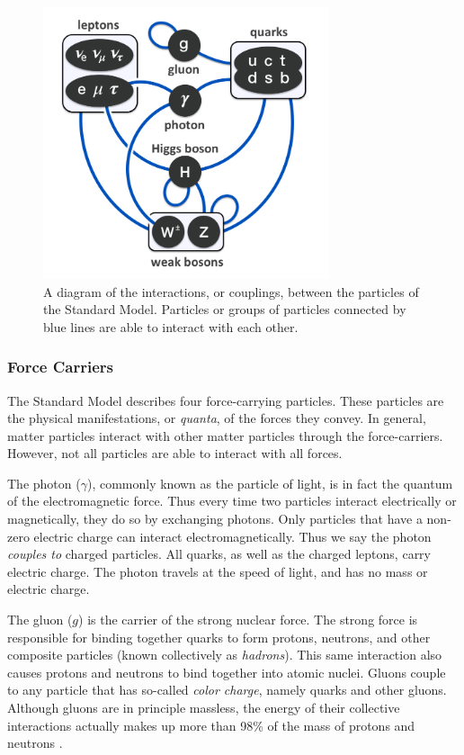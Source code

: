 \begin{figure}[h]
  \centering
  \includegraphics[width=0.75\textwidth]{figures/couplings.png}
  \caption{A diagram of the interactions, or couplings,
    between the particles of the Standard Model. Particles or groups
    of particles connected by blue lines are able to interact with
    each other.}
  \label{fig:couplings}
\end{figure}

\subsubsection*{Force Carriers}
The Standard Model describes four force-carrying particles. These
particles are the physical manifestations, or \emph{quanta}, of the forces
they convey. In general, matter particles interact with other matter
particles through the force-carriers. However, not all particles are
able to interact with all forces.


The photon ($\gamma$), commonly known as the particle of light,
is in fact the quantum of the electromagnetic
force. Thus every time two particles interact electrically or
magnetically, they do so by exchanging photons. Only particles that
have a non-zero electric charge can interact electromagnetically. Thus
we say the photon \emph{couples to} charged particles. All quarks, as
well as the charged leptons, carry electric charge. The photon travels
at the speed of light, and has no mass or electric charge.

The gluon ($g$) is the carrier of the strong nuclear force. The strong
force is responsible for binding together quarks to form protons,
neutrons, and other composite particles (known collectively as
\emph{hadrons}). This same interaction also causes protons and neutrons to
bind together into atomic nuclei. Gluons couple to any particle
that has so-called \emph{color charge}, namely quarks and
other gluons. Although gluons are in principle massless, the energy of
their collective interactions actually makes up more than 98\% of the
mass of protons and neutrons \cite{protonmass}.

